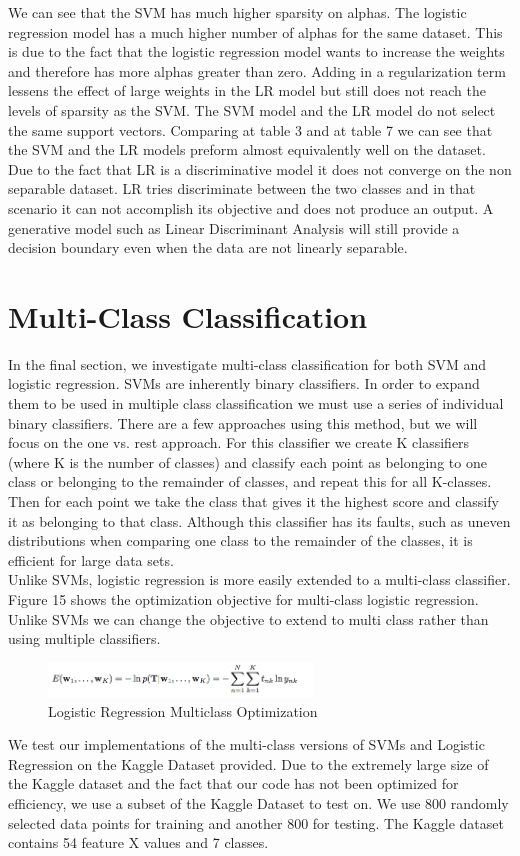\documentclass[pageno]{jpaper}
\begin{document}
We can see that the SVM has much higher sparsity on alphas. The logistic regression model has a much higher number of alphas for the same dataset. This is due to the fact that the logistic regression model wants to increase the weights and therefore has more alphas greater than zero. Adding in a regularization term lessens the effect of large weights in the LR model but still does not reach the levels of sparsity as the SVM. The SVM model and the LR model do not select the same support vectors. Comparing at table 3 and at table 7 we can see that the SVM and the LR models preform almost equivalently well on the dataset. Due to the fact that LR is a discriminative model it does not converge on the non separable dataset. LR tries discriminate between the two classes and in that scenario it can not accomplish its objective and does not produce an output. A generative model such as Linear Discriminant Analysis will still provide a decision boundary even when the data are not linearly separable.

\section{Multi-Class Classification}
In the final section, we investigate multi-class classification for both SVM and logistic regression. SVMs are inherently binary classifiers. In order to expand them to be used in multiple class classification we must use a series of individual binary classifiers. There are a few approaches using this method, but we will focus on the one vs. rest approach. For this classifier we create K classifiers (where K is the number of classes) and classify each point as belonging to one class or belonging to the remainder of classes, and repeat this for all K-classes. Then for each point we take the class that gives it the highest score and classify it as belonging to that class. Although this classifier has its faults, such as uneven distributions when comparing one class to the remainder of the classes, it is efficient for large data sets.\\
Unlike SVMs, logistic regression is more easily extended to a multi-class classifier. Figure 15 shows the optimization objective for multi-class logistic regression. Unlike SVMs we can change the objective to extend to multi class rather than using multiple classifiers.\\
\begin{figure}[ht!]
\centering
\includegraphics[width=70mm]{nll_mc}
\caption{Logistic Regression Multiclass Optimization}
\end{figure}
We test our implementations of the multi-class versions of SVMs and Logistic Regression on the Kaggle Dataset provided. Due to the extremely large size of the Kaggle dataset and the fact that our code has not been optimized for efficiency, we use a subset of the Kaggle Dataset to test on. We use 800 randomly selected data points for training and another 800 for testing. The Kaggle dataset contains 54 feature X values and 7 classes. 
\end{document}
